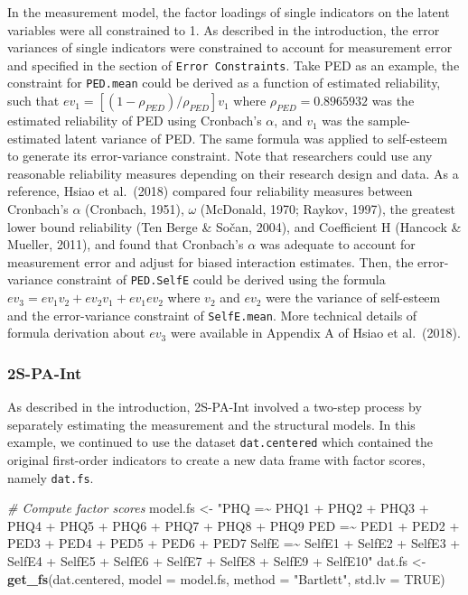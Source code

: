 \documentclass[
  man]{apa7}
\newenvironment{Shaded}{\begin{snugshade}}{\end{snugshade}}
\newcommand{\AttributeTok}[1]{\textcolor[rgb]{0.13,0.29,0.53}{#1}}
\newcommand{\CommentTok}[1]{\textcolor[rgb]{0.56,0.35,0.01}{\textit{#1}}}
\newcommand{\ConstantTok}[1]{\textcolor[rgb]{0.56,0.35,0.01}{#1}}
\newcommand{\FunctionTok}[1]{\textcolor[rgb]{0.13,0.29,0.53}{\textbf{#1}}}
\newcommand{\NormalTok}[1]{#1}
\newcommand{\OtherTok}[1]{\textcolor[rgb]{0.56,0.35,0.01}{#1}}
\newcommand{\StringTok}[1]{\textcolor[rgb]{0.31,0.60,0.02}{#1}}
\begin{document}
In the measurement model, the factor loadings of single indicators on the latent variables were all constrained to 1. As described in the introduction, the error variances of single indicators were constrained to account for measurement error and specified in the section of \texttt{Error\ Constraints}. Take PED as an example, the constraint for \texttt{PED.mean} could be derived as a function of estimated reliability, such that \(ev_{1} = [(1 - \rho_{PED})/{\rho_{PED}}]v_{1}\) where \(\rho_{PED} = 0.8965932\) was the estimated reliability of PED using Cronbach's \(\alpha\), and \(v_{1}\) was the sample-estimated latent variance of PED. The same formula was applied to self-esteem to generate its error-variance constraint. Note that researchers could use any reasonable reliability measures depending on their research design and data. As a reference, Hsiao et al.~(2018) compared four reliability measures between Cronbach's \(\alpha\) (Cronbach, 1951), \(\omega\) (McDonald, 1970; Raykov, 1997), the greatest lower bound reliability (Ten Berge \& Sočan, 2004), and Coefficient H (Hancock \& Mueller, 2011), and found that Cronbach's \(\alpha\) was adequate to account for measurement error and adjust for biased interaction estimates.
Then, the error-variance constraint of \texttt{PED.SelfE} could be derived using the formula \(ev_{3} = ev_{1}v_{2} + ev_{2}v_{1} + ev_{1}ev_{2}\) where \(v_{2}\) and \(ev_{2}\) were the variance of self-esteem and the error-variance constraint of \texttt{SelfE.mean}. More technical details of formula derivation about \(ev_{3}\) were available in Appendix A of Hsiao et al.~(2018).

\hypertarget{s-pa-int}{%
\subsubsection{2S-PA-Int}\label{s-pa-int}}

As described in the introduction, 2S-PA-Int involved a two-step process by separately estimating the measurement and the structural models. In this example, we continued to use the dataset \texttt{dat.centered} which contained the original first-order indicators to create a new data frame with factor scores, namely \texttt{dat.fs}.

\begin{Shaded}
\begin{Highlighting}[]
\CommentTok{\# Compute factor scores}
\NormalTok{model.fs }\OtherTok{\textless{}{-}} \StringTok{"PHQ =\textasciitilde{} PHQ1 + PHQ2 + PHQ3 + PHQ4 + PHQ5 + PHQ6 + PHQ7 + }
\StringTok{                    PHQ8 + PHQ9}
\StringTok{             PED =\textasciitilde{} PED1 + PED2 + PED3 + PED4 + PED5 + PED6 + PED7}
\StringTok{             SelfE =\textasciitilde{} SelfE1 + SelfE2 + SelfE3 + SelfE4 + SelfE5 + }
\StringTok{                      SelfE6 + SelfE7 + SelfE8 + SelfE9 + SelfE10"}
\NormalTok{dat.fs }\OtherTok{\textless{}{-}} \FunctionTok{get\_fs}\NormalTok{(dat.centered,}
                 \AttributeTok{model =}\NormalTok{ model.fs,}
                 \AttributeTok{method =} \StringTok{"Bartlett"}\NormalTok{,}
                 \AttributeTok{std.lv =} \ConstantTok{TRUE}\NormalTok{)}
\end{Highlighting}
\end{Shaded}
\end{document}
